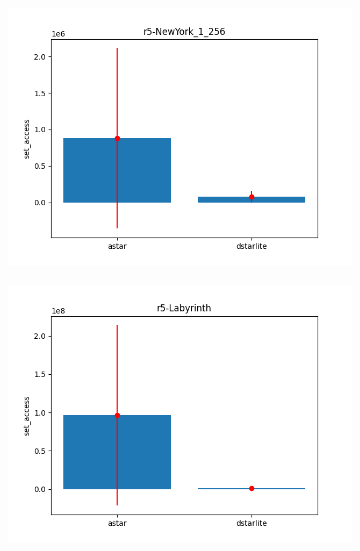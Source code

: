 \documentclass{beamer}
\begin{document}
\begin{frame}
\begin{figure}
            \hfill
            \begin{subfigure}[b]{0.49\textwidth}
                \centering
                \includegraphics[width=\textwidth]{../figures/astar-to-dstarlite/r5-NewYork_1_256}
            \end{subfigure}
            \hfill
            \begin{subfigure}[b]{0.49\textwidth}
                \centering
                \includegraphics[width=\textwidth]{../figures/astar-to-dstarlite/r5-Labyrinth}
            \end{subfigure}
        \end{figure}
    \end{frame}
\end{document}
